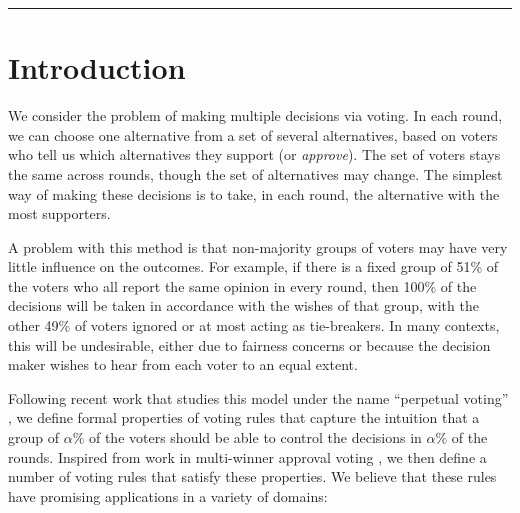 \documentclass[10pt]{scrartcl}
\theoremstyle{plain}
\theoremstyle{definition}
\begin{document}
\vspace{11pt}
\hrule

\newpage

\section{Introduction}
\label{sec:intro}

We consider the problem of making multiple decisions via voting.
In each round, we can choose one alternative from a set of several alternatives, based on voters who tell us which alternatives they support (or \emph{approve}). The set of voters stays the same across rounds, though the set of alternatives may change. 
The simplest way of making these decisions is to take, in each round, the alternative with the most supporters. 

A problem with this method is that non-majority groups of voters may have very little influence on the outcomes. For example, if there is a fixed group of 51\% of the voters who all report the same opinion in every round, then 100\% of the decisions will be taken in accordance with the wishes of that group, with the other 49\% of voters ignored or at most acting as tie-breakers. In many contexts, this will be undesirable, either due to fairness concerns or because the decision maker wishes to hear from each voter to an equal extent.

Following recent work that studies this model under the name ``perpetual voting'' \citep{lackner2020perpetual}, we define formal properties of voting rules that capture the intuition that a group of $\alpha\%$ of the voters should be able to control the decisions in $\alpha\%$ of the rounds. Inspired from work in multi-winner approval voting \citep{lacknerskowron}, we then define a number of voting rules that satisfy these properties. We believe that these rules have promising applications in a variety of domains:
\end{document}
